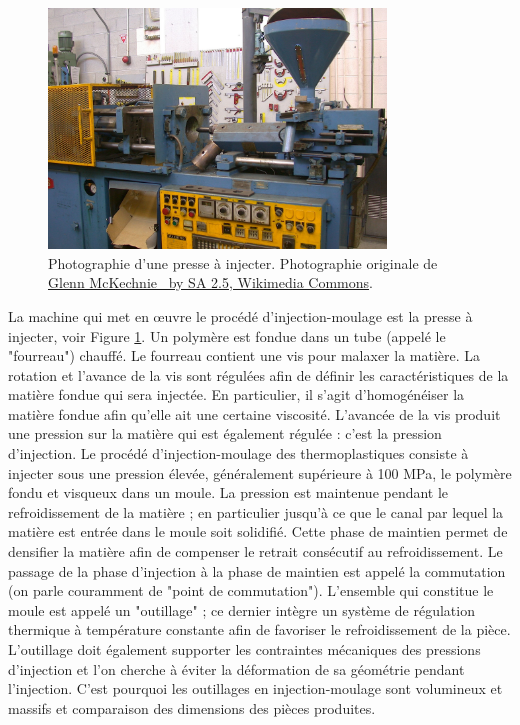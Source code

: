 \begin{figure}[bthp]
	\centering
	\includegraphics[width=0.8\textwidth,height=\textheight,keepaspectratio]{../Chap1/Figures/PlasticsInjectionMoulderJones.jpg}
	\caption{Photographie d'une presse à injecter. Photographie originale de \href{https://commons.wikimedia.org/wiki/File:PlasticsInjectionMoulderJones.jpg}{Glenn McKechnie \ccLogo \ by SA \textnormal{2.5}, Wikimedia Commons}.}
	\label{fig:PlasticsInjectionMoulderJones}
\end{figure}

La machine qui met en œuvre le procédé d'injection-moulage est la presse à injecter, voir Figure \ref{fig:PlasticsInjectionMoulderJones}.
Un polymère est fondue dans un tube (appelé le "fourreau") chauffé.  %
Le fourreau contient une vis pour malaxer la matière.  %
La rotation et l'avance de la vis sont régulées afin de définir les caractéristiques de la matière fondue qui sera injectée.
En particulier, il s'agit d'homogénéiser la matière fondue afin qu'elle ait une certaine viscosité.
L'avancée de la vis produit une pression sur la matière qui est également régulée : c'est la pression d'injection.
Le procédé d’injection-moulage des thermoplastiques consiste à injecter sous une pression élevée, généralement supérieure à 100 MPa, le polymère fondu et visqueux dans un moule.
La pression est maintenue pendant le refroidissement de la matière ; en particulier jusqu'à ce que le canal par lequel la matière est entrée dans le moule soit solidifié.
Cette phase de maintien permet de densifier la matière afin de compenser le retrait consécutif au refroidissement.
Le passage de la phase d'injection à la phase de maintien est appelé la commutation (on parle couramment de "point de commutation").
L'ensemble qui constitue le moule est appelé un "outillage" ; ce dernier intègre un système de régulation thermique à température constante afin de favoriser le refroidissement de la pièce.
L'outillage doit également supporter les contraintes mécaniques des pressions d'injection et l'on cherche à éviter la déformation de sa géométrie pendant l'injection.
C'est pourquoi les outillages en injection-moulage sont volumineux et massifs et comparaison des dimensions des pièces produites.

